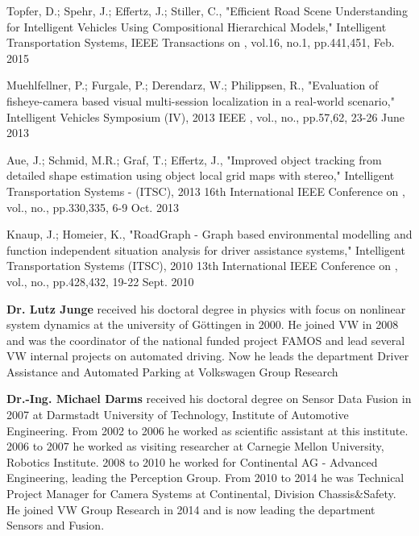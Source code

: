 \begin{keypubs}{\VW}
	\item
	Topfer, D.; Spehr, J.; Effertz, J.; Stiller, C., "Efficient Road Scene Understanding for Intelligent Vehicles Using Compositional Hierarchical Models," Intelligent Transportation Systems, IEEE Transactions on , vol.16, no.1, pp.441,451, Feb. 2015
	\item
	Muehlfellner, P.; Furgale, P.; Derendarz, W.; Philippsen, R., "Evaluation of fisheye-camera based visual multi-session localization in a real-world scenario," Intelligent Vehicles Symposium (IV), 2013 IEEE , vol., no., pp.57,62, 23-26 June 2013
	\item
	Aue, J.; Schmid, M.R.; Graf, T.; Effertz, J., "Improved object tracking from detailed shape estimation using object local grid maps with stereo," Intelligent Transportation Systems - (ITSC), 2013 16th International IEEE Conference on , vol., no., pp.330,335, 6-9 Oct. 2013
	\item
	Knaup, J.; Homeier, K., "RoadGraph - Graph based environmental modelling and function independent situation analysis for driver assistance systems," Intelligent Transportation Systems (ITSC), 2010 13th International IEEE Conference on , vol., no., pp.428,432, 19-22 Sept. 2010
	
\end{keypubs}



{\bf Dr. Lutz Junge} received his doctoral degree in physics with focus on nonlinear system dynamics at the university of G\"ottingen in 2000. He joined VW in 2008 and was the coordinator of the national funded project FAMOS and lead several VW internal projects on automated driving.  
Now he leads the department Driver Assistance and Automated Parking at Volkswagen Group Research

{\bf Dr.-Ing. Michael Darms} received his doctoral degree on Sensor Data Fusion in 2007 at Darmstadt University of Technology, Institute of Automotive Engineering. From 2002 to 2006 he worked as scientific assistant at this institute. 2006 to 2007 he worked as visiting researcher at Carnegie Mellon University, Robotics Institute. 2008 to 2010 he worked for Continental AG - Advanced Engineering, 
leading the Perception Group. From 2010 to 2014 he was Technical Project Manager for Camera Systems
at Continental, Division Chassis\&Safety. He joined VW Group Research in 2014 and is now leading the department Sensors and Fusion. 

